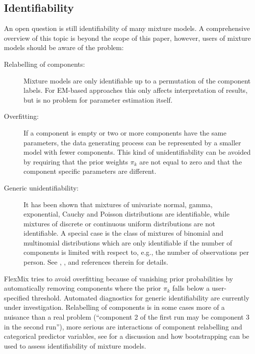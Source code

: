 \documentclass{jss}
\begin{document}
\subsection{Identifiability}
\label{sec:identifiability}

An open question is still identifiability of many mixture models. A
comprehensive overview of this topic is beyond the scope of this
paper, however, users of mixture models should be aware of the
problem:
\begin{description}
 \item[Relabelling of components:] Mixture models are only
  identifiable up to a permutation of the component labels. For
  EM-based approaches this only affects interpretation of results, but
  is no problem for parameter estimation itself.
  
 \item[Overfitting:] If a component is empty or two or more components
  have the same parameters, the data generating process can be
  represented by a smaller model with fewer components.  This kind of
  unidentifiability can be avoided by requiring that the prior weights
  $\pi_k$ are not equal to zero and that the component specific
  parameters are different.
  
 \item[Generic unidentifiability:] It has been shown that mixtures of
  univariate normal, gamma, exponential, Cauchy and Poisson
  distributions are identifiable, while mixtures of discrete or
  continuous uniform distributions are not identifiable. A special
  case is the class of mixtures of binomial and multinomial
  distributions which are only identifiable if the number of
  components is limited with respect to, e.g., the number of
  observations per person. See \cite{flb:Everitt+Hand:1981},
  \cite{flb:Titterington+Smith+Makov:1985},
  \cite{e1071-theses:Grun:2002} and references therein for details.
\end{description}

FlexMix tries to avoid overfitting because of vanishing prior
probabilities by automatically removing components where the prior
$\pi_k$ falls below a user-specified threshold. Automated diagnostics
for generic identifiability are currently under investigation.
Relabelling of components is in some cases more of a nuisance than a
real problem (``component 2 of the first run may be component 3 in the
second run''), more serious are interactions of component relabelling
and categorical predictor variables, see
\cite{e1071-papers:Grun+Leisch:2004} for a discussion and how
bootstrapping can be used to assess identifiability of mixture models.
\end{document}
